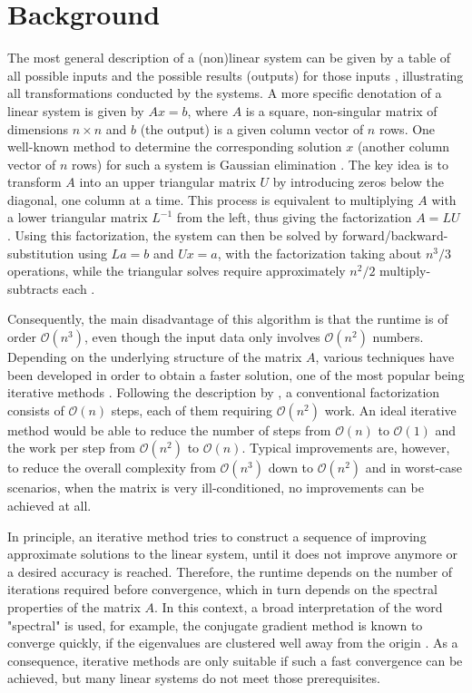 \section{Background}
\label{sec:background}

The most general description of a (non)linear system can be given by a table of all possible inputs and the possible results (outputs) for those inputs \cite{kailath_linear_1980}, illustrating all transformations conducted by the systems. A more specific denotation of a linear system is given by $Ax=b$, where $A$ is a square, non-singular matrix of dimensions $n \times n$ and $b$ (the output) is a given column vector of $n$ rows. One well-known method to determine the corresponding solution $x$ (another column vector of $n$ rows) for such a system is Gaussian elimination \cite{greenbaum_iterative_1997}. The key idea is to transform $A$ into an upper triangular matrix $U$ by introducing zeros below the diagonal, one column at a time. This process is equivalent to multiplying $A$ with a lower triangular matrix $L^{-1}$ from the left, thus giving the factorization $A=LU$ \cite{trefethen_numerical_1997}. Using this factorization, the system can then be solved by forward/backward-substitution using $La=b$ and $Ux=a$, with the factorization taking about $n^3/3$ operations, while the triangular solves require approximately $n^2/2$ multiply-subtracts each \cite{strang_introduction_2009}.

Consequently, the main disadvantage of this algorithm is that the runtime is of order $\mathcal{O}(n^3)$, even though the input data only involves $\mathcal{O}(n^2)$ numbers. 
Depending on the underlying structure of the matrix $A$, various techniques have been developed in order to obtain a faster solution, one of the most popular being iterative methods  \cite{strang_introduction_2009}. Following the description by \cite{trefethen_numerical_1997}, a conventional factorization consists of $\mathcal{O}(n)$ steps, each of them requiring $\mathcal{O}(n^2)$ work. An ideal iterative method would be able to reduce the number of steps from $\mathcal{O}(n)$ to $\mathcal{O}(1)$ and the work per step from $\mathcal{O}(n^2)$ to $\mathcal{O}(n)$. Typical improvements are, however, to reduce the overall complexity from $\mathcal{O}(n^3)$ down to $\mathcal{O}(n^2)$ and in worst-case scenarios, when the matrix is very ill-conditioned, no improvements can be achieved at all.

In principle, an iterative method tries to construct a sequence of improving approximate solutions to the linear system, until it does not improve anymore or a desired accuracy is reached. Therefore, the runtime depends on the number of iterations required before convergence, which in turn depends on the spectral properties of the matrix $A$. In this context, a broad interpretation of the word "spectral" is used, for example, the conjugate gradient method is known to converge quickly, if the eigenvalues are clustered well away from the origin \cite{trefethen_numerical_1997}. As a consequence, iterative methods are only suitable if such a fast convergence can be achieved, but many linear systems do not meet those prerequisites. 

